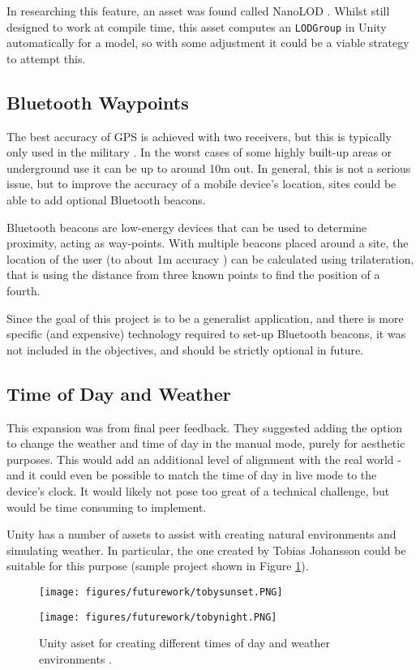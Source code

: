 \documentclass[12pt, a4paper]{article}
\begin{document}
In researching this feature, an asset was found called NanoLOD \cite{futurework:nanoLOD}. Whilst still designed to work at compile time, this asset computes an \verb|LODGroup| in Unity automatically for a model, so with some adjustment it could be a viable strategy to attempt this. 

\subsection{Bluetooth Waypoints}
The best accuracy of GPS is achieved with two receivers, but this is typically only used in the military \cite{futurework:gpsaccuracy}. In the worst cases of some highly built-up areas or underground use it can be up to around 10m out. In general, this is not a serious issue, but to improve the accuracy of a mobile device's location, sites could be able to add optional Bluetooth beacons. 

Bluetooth beacons are low-energy devices that can be used to determine proximity, acting as way-points. With multiple beacons placed around a site, the location of the user (to about 1m accuracy \cite{futurework:beaconaccuracy}) can be calculated using trilateration, that is using the distance from three known points to find the position of a fourth.

Since the goal of this project is to be a generalist application, and there is more specific (and expensive) technology required to set-up Bluetooth beacons, it was not included in the objectives, and should be strictly optional in future.

\subsection{Time of Day and Weather}
This expansion was from final peer feedback. They suggested adding the option to change the weather and time of day in the manual mode, purely for aesthetic purposes. This would add an additional level of alignment with the real world - and it could even be possible to match the time of day in live mode to the device's clock. It would likely not pose too great of a technical challenge, but would be time consuming to implement.

Unity has a number of assets to assist with creating natural environments and simulating weather. In particular, the one created by Tobias Johansson could be suitable for this purpose \cite{futurework:weather} (sample project shown in Figure \ref{fig:weather}).

\begin{figure}[H]
\centering
\begin{minipage}{.5\textwidth}
  \centering
  \texttt{[image: figures/futurework/tobysunset.PNG]}
\end{minipage}%
\begin{minipage}{.5\textwidth}
  \centering
  \texttt{[image: figures/futurework/tobynight.PNG]}
\end{minipage}
\caption{Unity asset for creating different times of day 
and weather environments \cite{futurework:weather}.}
\label{fig:weather}
\end{figure}
\end{document}
